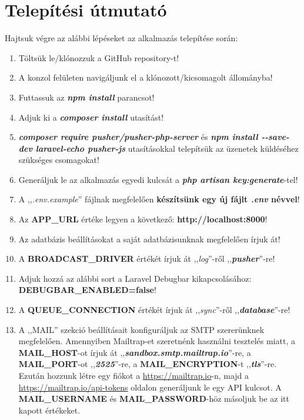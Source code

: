 \documentclass[
]{thesis-ekf}
\theoremstyle{definition}
\theoremstyle{remark}
\begin{document}
        \chapter{Telepítési útmutató}
        Hajtsuk végre az alábbi lépéseket az alkalmazás telepítése során:
        \begin{enumerate}
            \item Töltsük le/klónozzuk a GitHub repository-t!
            \item A konzol felületen navigáljunk el a klónozott/kicsomagolt állományba!
            \item Futtassuk az \emph{\textbf{npm install}} parancsot!
            \item Adjuk ki a \emph{\textbf{composer install}} utasítást!
            \item \emph{\textbf{composer require pusher/pusher-php-server}} és \emph{\textbf{npm install -{}-save-dev laravel-echo pusher-js}} utasításokkal telepítsük az üzenetek küldéséhez szükséges csomagokat!
            \item Generáljuk le az alkalmazás egyedi kulcsát a \emph{\textbf{php artisan key:generate}}-tel!
            \item A ,,\emph{.env.example}'' fájlnak megfelelően \textbf{készítsünk egy új fájlt \emph{.env} névvel}!
            \item Az \textbf{APP\_URL} értéke legyen a következő: \textbf{http://localhost:8000}!
            \item Az adatbázis beállításokat a saját adatbázisunknak megfelelően írjuk át!
            \item A \textbf{BROADCAST\_DRIVER} értékét írjuk át ,,\emph{log}''-ről ,,\emph{\textbf{pusher}}''-re!
            \item Adjuk hozzá az alábbi sort a Laravel Debugbar kikapcsolásához: \textbf{DEBUGBAR\_ENABLED=false}!
            \item A \textbf{QUEUE\_CONNECTION} értékét írjuk át ,,\emph{sync}''-ről ,,\emph{\textbf{database}}''-re!
            \item A ,,MAIL'' szekció beállításait konfiguráljuk az SMTP szererünknek megfelelően. Amennyiben Mailtrap-et szeretnénk használni tesztelés miatt, a \textbf{MAIL\_HOST}-ot  írjuk át ,,\emph{\textbf{sandbox.smtp.mailtrap.io}}''-re, a \textbf{MAIL\_PORT}-ot ,,\emph{\textbf{2525}}''-re, a \textbf{MAIL\_ENCRYPTION}-t ,,\emph{\textbf{tls}}''-re. Ezután hozzunk létre egy fiókot a \url{https://mailtrap.io}-n, majd a \url{https://mailtrap.io/api-tokens} oldalon generáljunk le egy API kulcsot. A \textbf{MAIL\_USERNAME} és \textbf{MAIL\_PASSWORD}-höz másoljuk be az itt kapott értékeket.

\end{enumerate}
\end{document}
